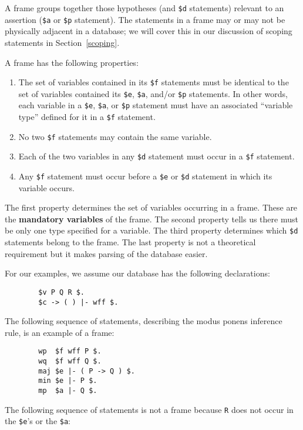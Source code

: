 A frame groups together those hypotheses (and \texttt{\$d} statements) relevant
to an assertion (\texttt{\$a} or \texttt{\$p} statement).  The statements in a frame
may or may not be physically adjacent in a database; we will cover
this in our discussion of scoping statements
in Section~\ref{scoping}.

A frame has the following properties:
\begin{enumerate}
 \item The set of variables contained in its \texttt{\$f} statements must
be identical to the set of variables contained its \texttt{\$e},
\texttt{\$a}, and/or \texttt{\$p} statements.  In other words, each
variable in a \texttt{\$e}, \texttt{\$a}, or \texttt{\$p} statement must
have an associated ``variable type'' defined for it in a \texttt{\$f}
statement.
  \item No two \texttt{\$f} statements may contain the same variable.
  \item Each of the two variables in any \texttt{\$d} statement must occur in a
\texttt{\$f} statement.
  \item Any \texttt{\$f} statement
must occur before a \texttt{\$e} or \texttt{\$d} statement in which its variable
occurs.
\end{enumerate}

The first property determines the set of variables occurring in a frame.
These are the {\bf mandatory
variables} of the frame.  The second property
tells us there must be only one type specified for a variable.  The
third property determines which \texttt{\$d} statements belong to the
frame.  The last property is not a theoretical requirement but it
makes parsing of the database easier.

For our examples, we assume our database has the following declarations:

\begin{verbatim}
        $v P Q R $.
        $c -> ( ) |- wff $.
\end{verbatim}

The following sequence of statements, describing the modus ponens inference
rule, is an example of a frame:

\begin{verbatim}
        wp  $f wff P $.
        wq  $f wff Q $.
        maj $e |- ( P -> Q ) $.
        min $e |- P $.
        mp  $a |- Q $.
\end{verbatim}

The following sequence of statements is not a frame because \texttt{R} does not
occur in the \texttt{\$e}'s or the \texttt{\$a}:


